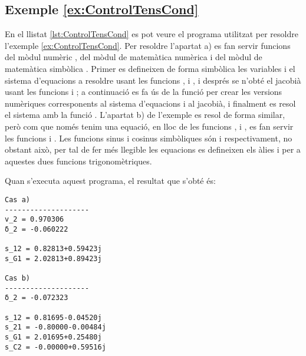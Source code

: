 \hypertarget{exemple:ControlTensCond}{\subsection{Exemple \ref*{ex:ControlTensCond} \ControlTensCond}}
En el llistat \vref{lst:ControlTensCond} es pot veure el programa utilitzat per resoldre l'exemple \vref{ex:ControlTensCond}. Per resoldre l'apartat a)   es fan servir funcions del mòdul numèric , del mòdul de matemàtica numèrica  i del mòdul de matemàtica simbòlica . Primer es defineixen de forma simbòlica les variables i el sistema d'equacions a resoldre usant les funcions ,  i , i després se n'obté el jacobià usant les funcions  i ; a continuació es fa ús de la funció   per crear les versions numèriques corresponents al sistema d'equacions i al jacobià, i finalment es resol el sistema amb la funció . L'apartat b) de l'exemple es resol de forma similar, però com que només tenim una equació, en lloc de les funcions ,  i , es fan servir les funcions  i . Les funcions sinus i cosinus simbòliques són   i   respectivament, no obstant això,  per tal de fer més llegible les equacions es defineixen els àlies  i  per a aquestes dues funcions trigonomètriques.


Quan s'executa aquest programa, el resultat que s'obté és:
\lstset{
	language=,
	numbers=none,
	frame=none
}
\begin{lstlisting}
Cas a)
--------------------
v_2 = 0.970306
δ_2 = -0.060222

s_12 = 0.82813+0.59423j
s_G1 = 2.02813+0.89423j

Cas b)
--------------------
δ_2 = -0.072323

s_12 = 0.81695-0.04520j
s_21 = -0.80000-0.00484j
s_G1 = 2.01695+0.25480j
s_C2 = -0.00000+0.59516j
\end{lstlisting} 


